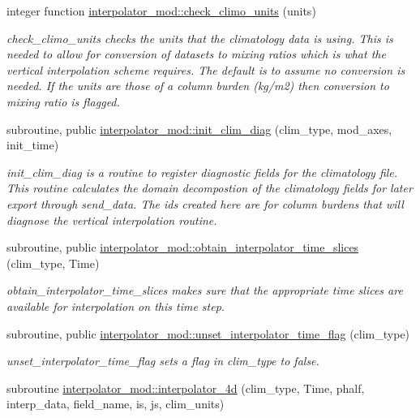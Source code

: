 \begin{DoxyCompactItemize}
integer function \hyperlink{namespaceinterpolator__mod_a964d51ef7fd4e420ca8306497ef88279}{interpolator\+\_\+mod\+::check\+\_\+climo\+\_\+units} (units)
\begin{DoxyCompactList}\small\item\em check\+\_\+climo\+\_\+units checks the units that the climatology data is using. This is needed to allow for conversion of datasets to mixing ratios which is what the vertical interpolation scheme requires. The default is to assume no conversion is needed. If the units are those of a column burden (kg/m2) then conversion to mixing ratio is flagged. \end{DoxyCompactList}\item 
subroutine, public \hyperlink{namespaceinterpolator__mod_a06df9761d5d17f3a33ad65fc800099d1}{interpolator\+\_\+mod\+::init\+\_\+clim\+\_\+diag} (clim\+\_\+type, mod\+\_\+axes, init\+\_\+time)
\begin{DoxyCompactList}\small\item\em init\+\_\+clim\+\_\+diag is a routine to register diagnostic fields for the climatology file. This routine calculates the domain decompostion of the climatology fields for later export through send\+\_\+data. The ids created here are for column burdens that will diagnose the vertical interpolation routine. \end{DoxyCompactList}\item 
subroutine, public \hyperlink{namespaceinterpolator__mod_af7a99acaf1d46d5729cf55d4544b685b}{interpolator\+\_\+mod\+::obtain\+\_\+interpolator\+\_\+time\+\_\+slices} (clim\+\_\+type, Time)
\begin{DoxyCompactList}\small\item\em obtain\+\_\+interpolator\+\_\+time\+\_\+slices makes sure that the appropriate time slices are available for interpolation on this time step. \end{DoxyCompactList}\item 
subroutine, public \hyperlink{namespaceinterpolator__mod_a75dd97cee018ee8dfe45361b82c8ed01}{interpolator\+\_\+mod\+::unset\+\_\+interpolator\+\_\+time\+\_\+flag} (clim\+\_\+type)
\begin{DoxyCompactList}\small\item\em unset\+\_\+interpolator\+\_\+time\+\_\+flag sets a flag in clim\+\_\+type to false. \end{DoxyCompactList}\item 
subroutine \hyperlink{namespaceinterpolator__mod_aa7289f28ea8f0fb09694f8cd62b16cc4}{interpolator\+\_\+mod\+::interpolator\+\_\+4d} (clim\+\_\+type, Time, phalf, interp\+\_\+data, field\+\_\+name, is, js, clim\+\_\+units)

\end{DoxyCompactItemize}
